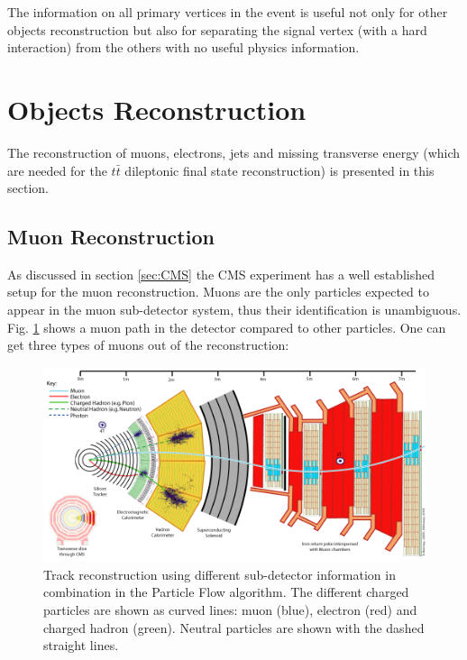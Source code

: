 The information on all primary vertices in the event is useful not only for other objects reconstruction but also for separating the signal vertex (with a hard interaction) 
from the others with no useful physics information.

\section{Objects Reconstruction}

The reconstruction of muons, electrons, jets and missing transverse energy (which are needed for the $t\bar{t}$ dileptonic final
state reconstruction) is presented in this section.

\subsection{Muon Reconstruction}

As discussed in section \ref{sec:CMS} the CMS experiment has a well established setup for the muon reconstruction.
Muons are the only particles expected to appear in the muon sub-detector system, thus their identification is unambiguous.
Fig. \ref{fig:PFmuons} shows a muon path in the detector compared to other particles.
One can get three types of muons out of the reconstruction:

\begin{figure}[t]
  \centering
  \includegraphics[width=1.0\textwidth]{04_event_reconstruction/plots/CMS_Slice.png}
  \caption{Track reconstruction using different sub-detector information in combination in the Particle Flow algorithm. The different
  charged particles are shown as curved lines: muon (blue), electron (red) and charged hadron (green). Neutral particles are shown
  with the dashed straight lines.}
  \label{fig:PFmuons}
\end{figure}

